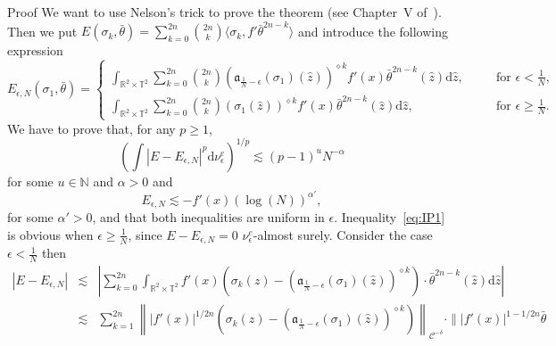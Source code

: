 \documentclass[a4paper,10pt]{article}
\newcommand{\mathd}{\mathrm{d}}
\newenvironment{proof*}[1]{\noindent\textbf{#1\ }}{\hspace*{\fill}$\Box$\medskip}
\begin{document}
\begin{proof*}{Proof}
  We want to use Nelson's trick to prove the theorem (see Chapter~V
  of~{\cite{Simon1974}}). Then we put $E (\sigma_k, \bar{\theta}) = \sum_{k =
  0}^{2 n} \binom{2 n}{k} \langle \sigma_k, f'  \bar{\theta}^{2 n - k}
  \rangle$ and introduce the following expression
  \[ E_{\epsilon, N} (\sigma_1, \bar{\theta}) = \left.
     \left\{\begin{array}{lll}
       \int_{\mathbb{R}^2 \times \mathbb{T}^2} \sum_{k = 0}^{2 n} \binom{2
       n}{k} \left( \mathfrak{a}_{\frac{1}{N} - \epsilon} (\sigma_1) (\hat{z})
       \right)^{\diamond k} f' (x)  \bar{\theta}^{2 n - k} (\hat{z}) \mathd
       \hat{z}, & \quad & \text{for $\epsilon < \frac{1}{N}$,}\\
       \int_{\mathbb{R}^2 \times \mathbb{T}^2} \sum_{k = 0}^{2 n} \binom{2
       n}{k} (\sigma_1 (\hat{z}))^{\diamond k} f' (x)  \bar{\theta}^{2 n - k}
       (\hat{z}) \mathd \hat{z}, &  & \text{for $\epsilon \geqslant
       \frac{1}{N}$.}
     \end{array}\right. \right. \]
  We have to prove that, for any $p \geq 1$,
  \begin{equation}
    \left( \int | E - E_{\epsilon, N} |^p \mathd \nu_{\epsilon}^e \right)^{1 /
    p} \lesssim (p - 1)^u N^{- \alpha} \label{eq:IP1}
  \end{equation}
  for some $u \in \mathbb{N}$ and $\alpha > 0$ and
  \begin{equation}
    E_{\epsilon, N} \lesssim - f' (x) (\log (N))^{\alpha'} \label{eq:IP2},
  \end{equation}
  for some $\alpha' > 0$, and that both inequalities are uniform in
  $\epsilon$. Inequality~{\eqref{eq:IP1}} is obvious when $\epsilon \geqslant
  \frac{1}{N}$, since $E - E_{\epsilon, N} = 0$ $\nu^e_{\epsilon}$-almost
  surely. Consider the case $\epsilon < \frac{1}{N}$ then
  \begin{eqnarray}
    | E - E_{\epsilon, N} | & \lesssim & \left| \sum_{k = 0}^{2 n}
    \int_{\mathbb{R}^2 \times \mathbb{T}^2} f' (x) \left( \sigma_k (z) -
    \left( \mathfrak{a}_{\frac{1}{N} - \epsilon} (\sigma_1) (\hat{z})
    \right)^{\diamond k} \right) \cdot \bar{\theta}^{2 n - k} (\hat{z}) \mathd
    \hat{z} \right| \nonumber\\
    & \lesssim & \sum_{k = 1}^{2 n} \left\| | f' (x) |^{1 / 2 n} \left(
    \sigma_k (z) - \left( \mathfrak{a}_{\frac{1}{N} - \epsilon} (\sigma_1)
    (\hat{z}) \right)^{\diamond k} \right) \right\|_{\mathcal{C}^{- \delta}}
    \cdot \| | f' (x) |^{1 - 1 / 2 n} \bar{\theta}

\end{eqnarray}
\end{proof*}
\end{document}
